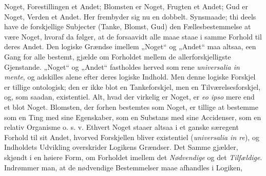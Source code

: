 \documentclass[12pt]{book}
\newcommand{\opage}[1]{\marginnote{\footnotesize\textit{[#1]}}}
\begin{document}
Noget, Forestillingen et Andet; Blomsten er Noget, Frugten et Andet; Gud er Noget, Verden et
Andet. Her frembyder sig nu en dobbelt.
Synsmaade; thi deels have de forskjellige Subjecter (Tanke, Blomst, Gud) den Fællesbestemmelse
at være Noget, hvoraf da følger, at de forsaavidt alle maae staae i samme Forhold til deres
Andet. Den logiske Grændse imellem „Noget“ og „Andet“ maa altsaa, een Gang for alle bestemt,
gjælde om Forholdet mellem de allerforskjelligste Gjenstande. „Noget“ og „Andet“ fastholdes
herved som rene \textit{universalia in mente}, og adskilles alene efter deres logiske Indhold.
Men denne logiske Forskjel er tillige ontologisk; den er ikke blot en Tankeforskjel, men en
Tilværelsesforskjel, og, som saadan, existentiel. Alt, hvad der virkelig er Noget, er
\textit{eo ipso} mere end et blot Noget. Blomsten, der forhen bestemtes som Noget, er tillige
at bestemme som en Ting med sine Egenskaber, som en Substans med sine Accidenser, som en
relativ Organisme o. s. v. Ethvert Noget staaer altsaa i et ganske særegent Forhold til sit
Andet, hvorved Forskjellen bliver existentiel (\textit{universalia in re}), og Indholdets
Udvikling overskrider Logikens Grændser. Det Samme gjælder, skjøndt i en høiere Form, om
Forholdet imellem det \emph{Nødvendige} og det \emph{Tilfældige}. Indrømmer man, at de
nødvendige Bestemmelser maae afhandles i Logiken,
\opage{101} %
\end{document}
